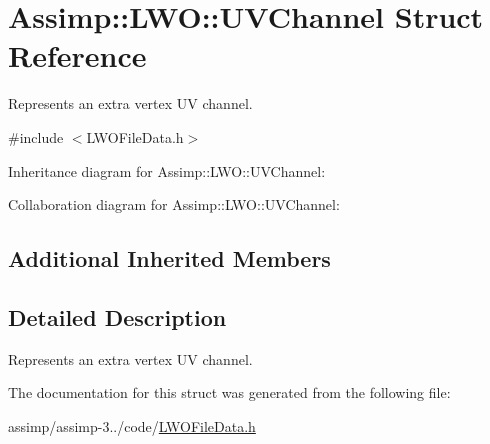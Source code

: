 \hypertarget{struct_assimp_1_1_l_w_o_1_1_u_v_channel}{\section{Assimp\+:\+:L\+W\+O\+:\+:U\+V\+Channel Struct Reference}
\label{struct_assimp_1_1_l_w_o_1_1_u_v_channel}
}


Represents an extra vertex U\+V channel.  




{\ttfamily \#include $<$L\+W\+O\+File\+Data.\+h$>$}



Inheritance diagram for Assimp\+:\+:L\+W\+O\+:\+:U\+V\+Channel\+:


Collaboration diagram for Assimp\+:\+:L\+W\+O\+:\+:U\+V\+Channel\+:
\subsection*{Additional Inherited Members}


\subsection{Detailed Description}
Represents an extra vertex U\+V channel. 

The documentation for this struct was generated from the following file\+:\begin{DoxyCompactItemize}
\item 
assimp/assimp-\/3../code/\hyperlink{_l_w_o_file_data_8h}{L\+W\+O\+File\+Data.\+h}\end{DoxyCompactItemize}
